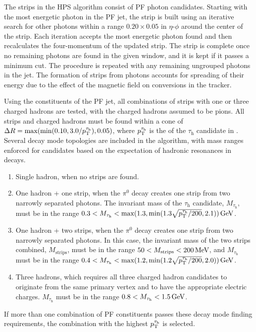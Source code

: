 \documentclass[12pt]{thesis}  %
\newcommand{\tauh}{\ensuremath{\tau_{\text{h}}}\xspace}
\begin{document}
The strips in the HPS algorithm consist of PF photon candidates. Starting with the most energetic photon in the PF jet, the strip is built using an iterative search for other photons within a range $0.20\times0.05$ in $\eta$-$\phi$ around the center of the strip. Each iteration accepts the most energetic photon found and then recalculates the four-momentum of the updated strip. The strip is complete once no remaining photons are found in the given window, and it is kept if it passes a minimum \pt cut. The procedure is repeated with any remaining ungrouped photons in the jet. The formation of strips from photons accounts for spreading of their energy due to the effect of the magnetic field on conversions in the tracker.

Using the constituents of the PF jet, all combinations of strips with one or three charged hadrons are tested, with the charged hadrons assumed to be pions. All strips and charged hadrons must be found within a cone of $\Delta R = \text{max}(\text{min}(0.10,3.0/\pt^{\tauh}),0.05)$, where $\pt^{\tauh}$ is the \pt of the \tauh candidate in \GeVns. Several decay mode topologies are included in the algorithm, with mass ranges enforced for candidates based on the expectation of hadronic resonances in decays.
\begin{enumerate}
\item Single hadron, when no strips are found.
\item One hadron + one strip, when the $\pi^0$ decay creates one strip from two narrowly separated photons. The invariant mass of the \tauh candidate, $M_{\tauh}$, must be in the range $0.3 < M_{\tauh} < \text{max}(1.3,\text{min}(1.3\sqrt{\pt^{\tauh}/200},2.1))\GeV$.
\item One hadron + two strips, when the $\pi^0$ decay creates one strip from two narrowly separated photons. In this case, the invariant mass of the two strips combined, $M_{\text{strips}}$, must be in the range $50 < M_{\text{strips}} < 200\,\text{Me\hspace{-.08em}V}$, and $M_{\tauh}$ must be in the range $0.4 < M_{\tauh} < \text{max}(1.2,\text{min}(1.2\sqrt{\pt^{\tauh}/200},2.0))\GeV$.
\item Three hadrons, which requires all three charged hadron candidates to originate from the same primary vertex and to have the appropriate electric charges. $M_{\tauh}$ must be in the range $0.8 < M_{\tauh} < 1.5\GeV$.
\end{enumerate}
If more than one combination of PF constituents passes these decay mode finding requirements, the combination with the highest $\pt^{\tauh}$ is selected.
\end{document}

